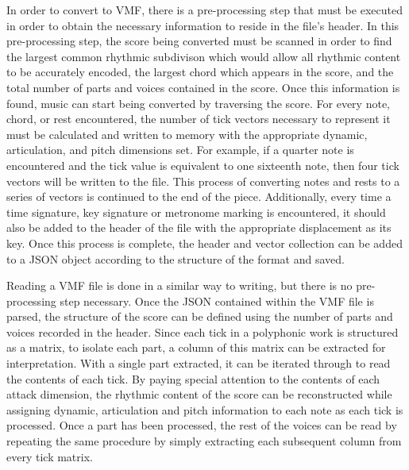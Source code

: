In order to convert to VMF, there is a pre-processing step that must be executed in order to obtain the necessary information to reside in the file's header. In this pre-processing step, the score being converted must be scanned in order to find the largest common rhythmic subdivison which would allow all rhythmic content to be accurately encoded, the largest chord which appears in the score, and the total number of parts and voices contained in the score. Once this information is found, music can start being converted by traversing the score. For every note, chord, or rest encountered, the number of tick vectors necessary to represent it must be calculated and written to memory with the appropriate dynamic, articulation, and pitch dimensions set. For example, if a quarter note is encountered and the tick value is equivalent to one sixteenth note, then four tick vectors will be written to the file. This process of converting notes and rests to a series of vectors is continued to the end of the piece. Additionally, every time a time signature, key signature or metronome marking is encountered, it should also be added to the header of the file with the appropriate displacement as its key. Once this process is complete, the header and vector collection can be added to a JSON object according to the structure of the format and saved.

Reading a VMF file is done in a similar way to writing, but there is no pre-processing step necessary. Once the JSON contained within the VMF file is parsed, the structure of the score can be defined using the number of parts and voices recorded in the header. Since each tick in a polyphonic work is structured as a matrix, to isolate each part, a column of this matrix can be extracted for interpretation. With a single part extracted, it can be iterated through to read the contents of each tick. By paying special attention to the contents of each attack dimension, the rhythmic content of the score can be reconstructed while assigning dynamic, articulation and pitch information to each note as each tick is processed. Once a part has been processed, the rest of the voices can be read by repeating the same procedure by simply extracting each subsequent column from every tick matrix.